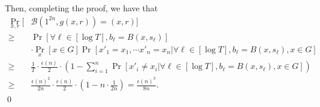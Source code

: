 Then, completing the proof, we have that
\begin{align*}
\Pr_{x,r}[&\mathcal{B}(1^{2n}, g(x,r)) = (x,r)]\\
\geq&  \Pr\left[\forall \ell \in [\log T], b_\ell = B(x,s_\ell)\right] \\& \cdot  \Pr_x [x \in G] \Pr[x'_1 = x_1, \cdots x'_n = x_n | \forall \ell \in [\log T], b_\ell = B(x,s_\ell), x \in G]\\
\geq& \frac{1}{T} \cdot \frac{\epsilon(n)}{2} \cdot \left(1- \sum_{i=1}^n\Pr[x'_i \neq x_i | \forall \ell \in [\log T], b_\ell = B(x,s_\ell), x \in G]\right)\\
\geq& \frac{\epsilon(n)^2}{2n} \cdot \frac{\epsilon(n)}{2} \cdot \left(1- n \cdot\frac{1}{2n} \right) =  \frac{\epsilon(n)^3}{8n}.
\end{align*}
\qed

